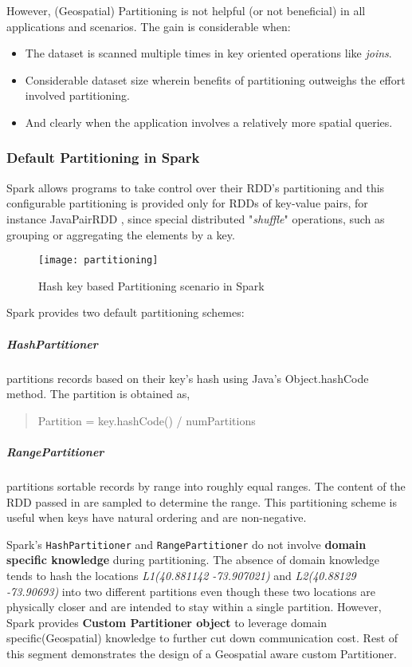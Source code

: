\documentclass[article,type=msc,colorback,12pt,accentcolor=tud1d]{tudthesis}
\begin{document}
			However, (Geospatial) Partitioning is not helpful (or not beneficial) in all applications and scenarios. The gain is considerable when: \cite{sparkbook}
			\begin{itemize}
				\item The dataset is scanned multiple times in key oriented operations like \textit{joins}.
				\item Considerable dataset size wherein benefits of partitioning outweighs the effort involved partitioning.
				\item And clearly when the application involves a relatively more spatial queries.
			\end{itemize}
			
		\subsubsection{Default Partitioning in Spark}
			\par Spark allows programs to take control over their RDD's partitioning and this configurable partitioning is provided only for RDDs of key-value pairs, for instance JavaPairRDD \cite{sparkapiPairRDD}, since special distributed "\textit{shuffle}" operations, such as grouping or aggregating the elements by a key.\\
			
				\begin{figure}[h]
					\centering
					\texttt{[image: partitioning]}
					\caption{Hash key based Partitioning scenario in Spark}
					\label{fig:partitioning}
				\end{figure}
				
			\clearpage
			\par Spark provides two default partitioning schemes:
			\subparagraph{HashPartitioner} partitions records based on their key's hash using Java's Object.hashCode method. The partition is obtained as,
			
			\begin{quote}
				\centering Partition = key.hashCode() / numPartitions
			\end{quote}
			
			\subparagraph{RangePartitioner} partitions sortable records by range into roughly equal ranges. The content of the RDD passed in are sampled to determine the range\cite{sparkapiPartitioner}. This partitioning scheme is useful when keys have natural ordering and are non-negative.
			
			Spark's \texttt{HashPartitioner} and \texttt{RangePartitioner} do not involve \textbf{domain specific knowledge} during partitioning. The absence of domain knowledge tends to hash the locations \textit{L1(40.881142 -73.907021)} and \textit{L2(40.88129 -73.90693)} into two different partitions even though these two locations are physically closer and are intended to stay within a single partition. However, Spark provides \textbf{Custom Partitioner object} to leverage domain specific(Geospatial) knowledge to further cut down communication cost. Rest of this segment demonstrates the design of a Geospatial aware custom Partitioner.
			
\end{document}
